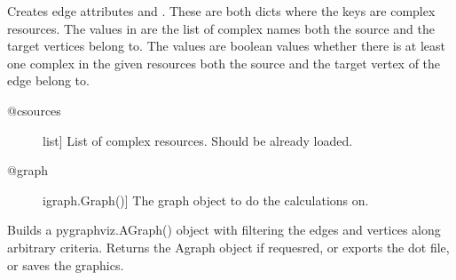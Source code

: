 \documentclass[letterpaper,10pt,english]{sphinxmanual}
\begin{document}
\begin{fulllineitems}
\begin{fulllineitems}
\label{\detokenize{main:pypath.main.PyPath.edges_in_comlexes}}
Creates edge attributes  and .
These are both dicts where the keys are complex resources.
The values in  are the list of complex names
both the source and the target vertices belong to.
The values  are boolean values whether there
is at least one complex in the given resources both the
source and the target vertex of the edge belong to.
\begin{description}
\item[{@csources}] \leavevmode{[}list{]}
List of complex resources. Should be already loaded.

\item[{@graph}] \leavevmode{[}igraph.Graph(){]}
The graph object to do the calculations on.

\end{description}

\end{fulllineitems}


\begin{fulllineitems}
\label{\detokenize{main:pypath.main.PyPath.edges_ptms}}
\end{fulllineitems}


\begin{fulllineitems}
\label{\detokenize{main:pypath.main.PyPath.edgeseq_inverse}}
\end{fulllineitems}


\begin{fulllineitems}
\label{\detokenize{main:pypath.main.PyPath.export_dot}}
Builds a pygraphviz.AGraph() object with filtering the edges
and vertices along arbitrary criteria.
Returns the Agraph object if requesred, or exports the dot
file, or saves the graphics.


\end{fulllineitems}
\end{fulllineitems}
\end{document}
